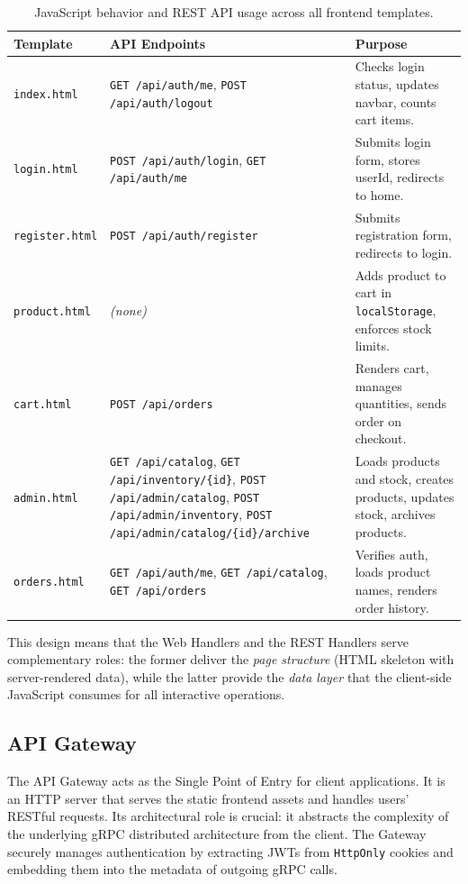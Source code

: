 \documentclass[12pt,a4paper]{article}
\begin{document}
\begin{table}[h]
\centering
\footnotesize
\begin{tabularx}{\textwidth}{|l|X|X|}
\hline
\textbf{Template} & \textbf{API Endpoints} & \textbf{Purpose} \\
\hline
\texttt{index.html} & \texttt{GET /api/auth/me}, \texttt{POST /api/auth/logout} & Checks login status, updates navbar, counts cart items. \\
\hline
\texttt{login.html} & \texttt{POST /api/auth/login}, \texttt{GET /api/auth/me} & Submits login form, stores userId, redirects to home. \\
\hline
\texttt{register.html} & \texttt{POST /api/auth/register} & Submits registration form, redirects to login. \\
\hline
\texttt{product.html} & \textit{(none)} & Adds product to cart in \texttt{localStorage}, enforces stock limits. \\
\hline
\texttt{cart.html} & \texttt{POST /api/orders} & Renders cart, manages quantities, sends order on checkout. \\
\hline
\texttt{admin.html} & \texttt{GET /api/catalog}, \texttt{GET /api/inventory/\{id\}}, \texttt{POST /api/admin/catalog}, \texttt{POST /api/admin/inventory}, \texttt{POST /api/admin/catalog/\{id\}/archive} & Loads products and stock, creates products, updates stock, archives products. \\
\hline
\texttt{orders.html} & \texttt{GET /api/auth/me}, \texttt{GET /api/catalog}, \texttt{GET /api/orders} & Verifies auth, loads product names, renders order history. \\
\hline
\end{tabularx}
\caption{JavaScript behavior and REST API usage across all frontend templates.}
\label{tab:js-templates}
\end{table}

This design means that the Web Handlers and the REST Handlers serve complementary roles: the former deliver the \textit{page structure} (HTML skeleton with server-rendered data), while the latter provide the \textit{data layer} that the client-side JavaScript consumes for all interactive operations.

\subsection{API Gateway}
The API Gateway acts as the Single Point of Entry for client applications. It is an HTTP server that serves the static frontend assets and handles users' RESTful requests. Its architectural role is crucial: it abstracts the complexity of the underlying gRPC distributed architecture from the client. The Gateway securely manages authentication by extracting JWTs from \texttt{HttpOnly} cookies and embedding them into the metadata of outgoing gRPC calls.
\end{document}
